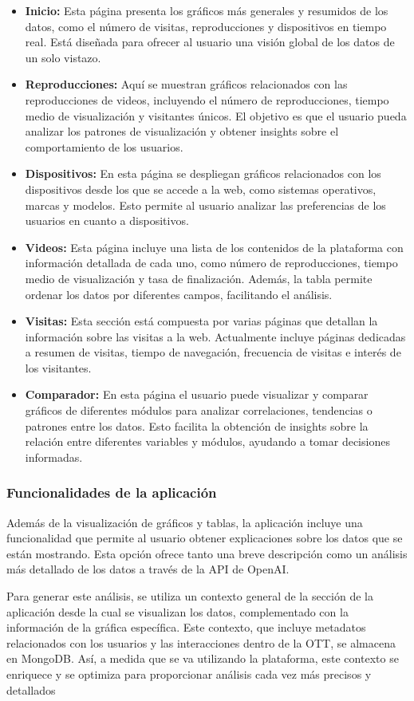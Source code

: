 \begin{itemize} 
    \item \textbf{Inicio:} Esta página presenta los gráficos más generales y resumidos de los datos, como el número de visitas, 
    reproducciones y dispositivos en tiempo real. Está diseñada para ofrecer al usuario una visión global de los datos de un solo vistazo. 
    \item \textbf{Reproducciones:} Aquí se muestran gráficos relacionados con las reproducciones de videos, incluyendo el número de reproducciones, 
    tiempo medio de visualización y visitantes únicos. El objetivo es que el usuario pueda analizar los patrones de visualización y obtener insights 
    sobre el comportamiento de los usuarios. 
    \item \textbf{Dispositivos:} En esta página se despliegan gráficos relacionados con los dispositivos desde los que se accede a la web, como 
    sistemas operativos, marcas y modelos. Esto permite al usuario analizar las preferencias de los usuarios en cuanto a dispositivos. 
    \item \textbf{Videos:} Esta página incluye una lista de los contenidos de la plataforma con información detallada de cada uno, como número de 
    reproducciones, tiempo medio de visualización y tasa de finalización. Además, la tabla permite ordenar los datos por diferentes campos, facilitando el análisis. 
    \item \textbf{Visitas:} Esta sección está compuesta por varias páginas que detallan la información sobre las visitas a la web. Actualmente incluye 
    páginas dedicadas a resumen de visitas, tiempo de navegación, frecuencia de visitas e interés de los visitantes. 
    \item \textbf{Comparador:} En esta página el usuario puede visualizar y comparar gráficos de diferentes módulos para analizar correlaciones, 
    tendencias o patrones entre los datos. Esto facilita la obtención de insights sobre la relación entre diferentes variables y módulos, ayudando 
    a tomar decisiones informadas. 
\end{itemize}


\subsubsection{Funcionalidades de la aplicación}
\label{sec:diseno-funcionalidades}

Además de la visualización de gráficos y tablas, la aplicación incluye una funcionalidad que permite al usuario obtener explicaciones sobre los 
datos que se están mostrando. Esta opción ofrece tanto una breve descripción como un análisis más detallado de los datos a través de la API de OpenAI.

Para generar este análisis, se utiliza un contexto general de la sección de la aplicación desde la cual se visualizan los datos, complementado con 
la información de la gráfica específica. Este contexto, que incluye metadatos relacionados con los usuarios y las interacciones dentro de la OTT, se 
almacena en MongoDB. Así, a medida que se va utilizando la plataforma, este contexto se enriquece y se optimiza para proporcionar análisis cada vez más 
precisos y detallados



